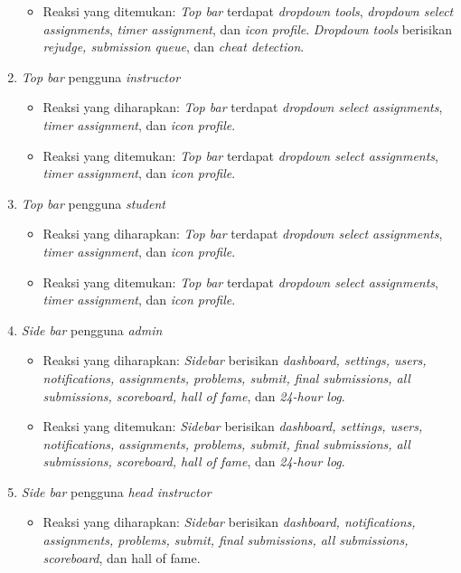 \begin{enumerate}
\begin{itemize}
	 	\item Reaksi yang ditemukan: \textit{Top bar} terdapat \textit{dropdown tools}, \textit{dropdown select assignments}, \textit{timer assignment}, dan \textit{icon profile}. \textit{Dropdown tools} berisikan \textit{rejudge, submission queue}, dan \textit{cheat detection}.
	 \end{itemize}
	 \item \textit{Top bar} pengguna \textit{instructor}
	 \begin{itemize}
	 	\item Reaksi yang diharapkan: \textit{Top bar} terdapat \textit{dropdown select assignments}, \textit{timer assignment}, dan \textit{icon profile}.
	 	\item Reaksi yang ditemukan: \textit{Top bar} terdapat \textit{dropdown select assignments}, \textit{timer assignment}, dan \textit{icon profile}.
	 \end{itemize}
	 \item \textit{Top bar} pengguna \textit{student}
	 \begin{itemize}
	 	\item Reaksi yang diharapkan: \textit{Top bar} terdapat \textit{dropdown select assignments}, \textit{timer assignment}, dan \textit{icon profile}.
	 	\item Reaksi yang ditemukan: \textit{Top bar} terdapat \textit{dropdown select assignments}, \textit{timer assignment}, dan \textit{icon profile}.
	 \end{itemize}
	 \item \textit{Side bar} pengguna \textit{admin}
	 \begin{itemize}
	 	\item Reaksi yang diharapkan: \textit{Sidebar} berisikan \textit{dashboard, settings, users, notifications, assignments, problems, submit, final submissions, all submissions, scoreboard, hall of fame}, dan \textit{24-hour log}.
	 	\item Reaksi yang ditemukan: \textit{Sidebar} berisikan \textit{dashboard, settings, users, notifications, assignments, problems, submit, final submissions, all submissions, scoreboard, hall of fame}, dan \textit{24-hour log}. 
	 \end{itemize}
	 \item \textit{Side bar} pengguna \textit{head instructor}
	 \begin{itemize}
	 	\item Reaksi yang diharapkan: \textit{Sidebar} berisikan \textit{dashboard, notifications, assignments, problems, submit, final submissions, all submissions, scoreboard}, dan hall of fame.

\end{itemize}
\end{enumerate}
